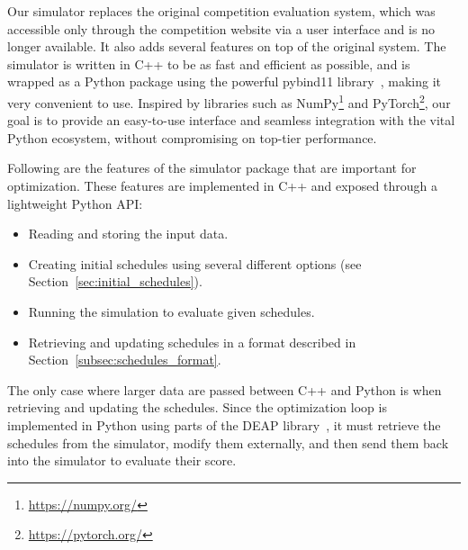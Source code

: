 Our simulator replaces the original competition evaluation system, which was accessible only through the competition website via a user interface and is no longer available. It also adds several features on top of the original system.
The simulator is written in C++ to be as fast and efficient as possible, and is wrapped as a Python package using the powerful pybind11 library~\cite{jakob2017pybind11}, making it very convenient to use.
Inspired by libraries such as NumPy\footnote{\url{https://numpy.org/}} and PyTorch\footnote{\url{https://pytorch.org/}}, our goal is to provide an easy-to-use interface and seamless integration with the vital Python ecosystem, without compromising on top-tier performance.

Following are the features of the simulator package that are important for optimization. These features are implemented in C++ and exposed through a lightweight Python API:
\begin{itemize}
    \item Reading and storing the input data.
    \item Creating initial schedules using several different options (see Section~\ref{sec:initial_schedules}).
    \item Running the simulation to evaluate given schedules.
    \item Retrieving and updating schedules in a format described in Section~\ref{subsec:schedules_format}.
\end{itemize}

The only case where larger data are passed between C++ and Python is when retrieving and updating the schedules.
Since the optimization loop is implemented in Python using parts of the DEAP library~\cite{fortin2012deap}, it must retrieve the schedules from the simulator, modify them externally, and then send them back into the simulator to evaluate their score.
